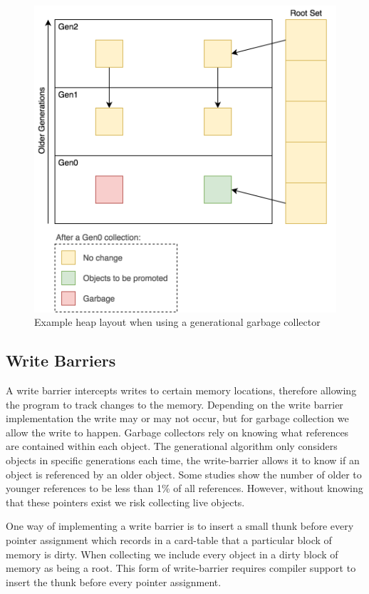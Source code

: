 \documentclass[../diss.tex]{subfiles}
\begin{document}
\begin{figure}
    \centering
    \includegraphics[max width=\linewidth]{figs/generational.png}
    \caption{Example heap layout when using a generational garbage collector}
    \label{fig:generational}
\end{figure}

\subsection{Write Barriers} \label{sec:prepwritebarriers}

A write barrier intercepts writes to certain memory locations, therefore allowing the program to track changes to the memory. Depending on the write barrier implementation the write may or may not occur, but for garbage collection we allow the write to happen. Garbage collectors rely on knowing what references are contained within each object. The generational algorithm only considers objects in specific generations each time, the write-barrier allows it to know if an object is referenced by an older object. Some studies show the number of older to younger references to be less than 1\% of all references. However, without knowing that these pointers exist we risk collecting live objects.

One way of implementing a write barrier is to insert a small thunk before every pointer assignment which records in a card-table that a particular block of memory is dirty. When collecting we include every object in a dirty block of memory as being a root. This form of write-barrier requires compiler support to insert the thunk before every pointer assignment.
\end{document}
